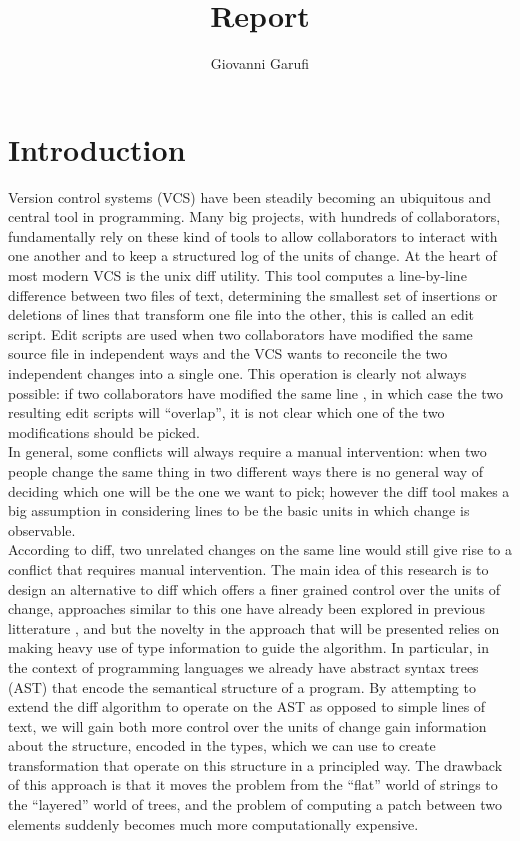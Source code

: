 \documentclass[11pt]{article}
\title{Report}
\author{Giovanni Garufi}
\date{}
\begin{document}
\maketitle

\section{Introduction}
Version control systems (VCS) have been steadily becoming an ubiquitous and central 
tool in programming. Many big projects, with hundreds of collaborators, 
fundamentally rely on these kind of tools to allow collaborators to interact 
with one another and to keep a structured log of the units of change. 
At the heart of most modern VCS is the unix diff utility. This tool computes a 
line-by-line difference between two files of text, determining the smallest set 
of insertions or deletions of lines that transform one file into the other, this is called an edit script. 
Edit scripts are used when two collaborators have modified the same source file in independent 
ways and the VCS wants to reconcile the two independent changes into a single 
one. This operation is clearly not always possible: if two collaborators have 
modified the same line , in which case the two resulting edit scripts will 
``overlap'', it is not clear which one of the two modifications should be 
picked.  \\
In general, some conflicts will always require a manual intervention: when two 
people change the same thing in two different ways there is no general way of 
deciding which one will be the one we want to pick; however the diff tool makes 
a big assumption in considering lines to be the basic units in which change is 
observable.  \\
According to diff, two unrelated changes on the same line would still give rise to a 
conflict that requires manual intervention. 
The main idea of this research is to design an alternative to diff which offers a 
finer grained control over the units of change, approaches similar to this one have already been explored in previous litterature
\cite{semantics-VC}, \cite{structure-aware-VC} and \cite{vassena} but the novelty in the approach that will be presented 
relies on making heavy use of type information to guide the algorithm. In particular, in the context of 
programming languages we already have abstract syntax trees (AST) that encode 
the semantical structure of a program. By attempting to extend the diff algorithm to operate on the AST 
as opposed to simple lines of text, we will gain both more control over the units of change gain information about the structure, 
encoded in the types, which we can use to create transformation that operate on this structure in a principled way. 
The drawback of this approach is that it moves the problem from the ``flat'' 
world of strings to the ``layered'' world of trees, and the problem of computing a patch between two elements suddenly
becomes much more computationally expensive. 
\end{document}
